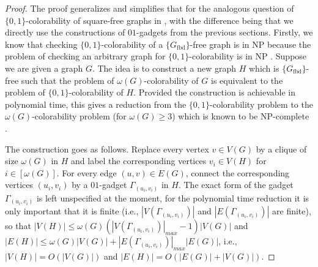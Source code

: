 \documentclass[twocolumn, a4paper, superscriptaddress,nofootinbib, accepted=2020-08-07, hyperref]{quantumarticle}
\begin{document}
\begin{proof}
	The proof generalizes and simplifies that for the analogous question of $\{0,1\}$-colorability of square-free graphs in \cite{Arends09}, with the difference being that we directly use the constructions of $01$-gadgets from the previous sections. Firstly, we know that checking $\{0,1\}$-colorability of a $\{G_{\text{fbd}}\}$-free graph is in NP because the problem of checking an arbitrary graph for $\{0,1\}$-colorability is in NP \cite{Arends09}. Suppose we are given a graph $G$. The idea is to construct a new graph $H$ which is $\{G_{\text{fbd}}\}$-free such that the problem of $\omega(G)$-colorability of $G$ is equivalent to the problem of $\{0,1\}$-colorability of $H$. Provided the construction is achievable in polynomial time, this gives a reduction from the $\{0,1\}$-colorability problem to the $\omega(G)$-colorability problem (for $\omega(G) \geq 3$) which is known to be NP-complete \cite{CLRS01}. 
	
	The construction goes as follows. Replace every vertex $v \in V(G)$ by a clique of size $\omega(G)$ in $H$ and label the corresponding vertices $v_i \in V(H)$ for $i \in [\omega(G)]$. For every edge $(u,v) \in E(G)$, connect the corresponding vertices $(u_i,v_i)$ by a $01$-gadget $\Gamma_{(u_i,v_i)}$ in $H$. The exact form of the gadget $\Gamma_{(u_i,v_i)}$ is left unspecified at the moment, for the polynomial time reduction it is only important that it is finite (i.e., $|V(\Gamma_{(u_i,v_i)})|$ and $|E(\Gamma_{(u_i,v_i)})|$ are finite), so that $|V(H)| \leq \omega(G) (|V(\Gamma_{(u_i,v_i)})|_{max}-1) |V(G)|$ and $|E(H)| \leq \omega(G) | V(G)| + |E(\Gamma_{(u_i,v_i)})|_{max} |E(G)|$, i.e., $|V(H)| = O(|V(G)|)$ and $|E(H)| = O(|E(G)| + |V(G)|)$. 
	

\end{proof}
\end{document}
